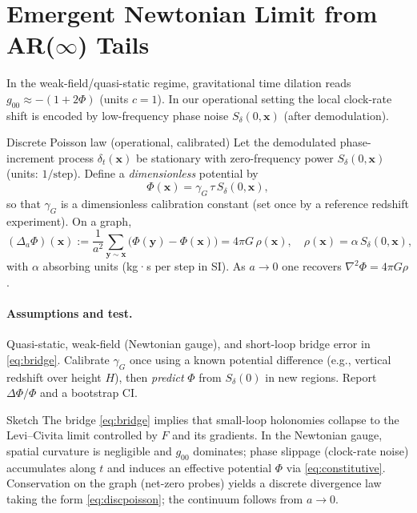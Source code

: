 \documentclass[11pt]{article}
\begin{document}
\section{Emergent Newtonian Limit from AR($\infty$) Tails}
In the weak-field/quasi-static regime, gravitational time dilation reads $g_{00}\approx-(1+2\Phi)$ (units $c=1$). In our operational setting the local clock-rate shift is encoded by low-frequency phase noise $S_\delta(0,\mathbf x)$ (after demodulation).

\begin{myprop}{Discrete Poisson law (operational, calibrated)}
Let the demodulated phase-increment process $\delta_t(\mathbf x)$ be stationary with
zero-frequency power $S_\delta(0,\mathbf x)$ (units: $1/\text{step}$). Define a
\emph{dimensionless} potential by
\[
\Phi(\mathbf x)=\gamma_G\,\tau\,S_\delta(0,\mathbf x),
\]
so that $\gamma_G$ is a dimensionless calibration constant (set once by a reference
redshift experiment). On a graph,
\[
(\Delta_a \Phi)(\mathbf x):=\frac{1}{a^2}\!\sum_{\mathbf y\sim \mathbf x}\!
\big(\Phi(\mathbf y)-\Phi(\mathbf x)\big)=4\pi G\,\rho(\mathbf x),
\quad \rho(\mathbf x)=\alpha\,S_\delta(0,\mathbf x),
\]
with $\alpha$ absorbing units (kg·s per step in SI). As $a\to0$ one recovers
$\nabla^2\Phi=4\pi G\rho$.
\end{myprop}

\paragraph{Assumptions and test.}
Quasi-static, weak-field (Newtonian gauge), and short-loop bridge error in \eqref{eq:bridge}.
Calibrate $\gamma_G$ once using a known potential difference (e.g., vertical redshift
over height $H$), then \emph{predict} $\Phi$ from $S_\delta(0)$ in new regions.
Report $\Delta\Phi/\Phi$ and a bootstrap CI.


\begin{proofbox}{Sketch}
The bridge \eqref{eq:bridge} implies that small-loop holonomies collapse to the Levi--Civita limit controlled by $F$ and its gradients.
In the Newtonian gauge, spatial curvature is negligible and $g_{00}$ dominates; phase slippage (clock-rate noise) accumulates along $t$ and induces an effective potential $\Phi$ via \eqref{eq:constitutive}.
Conservation on the graph (net-zero probes) yields a discrete divergence law taking the form \eqref{eq:discpoisson}; the continuum follows from $a\to0$.
\end{proofbox}
\end{document}
